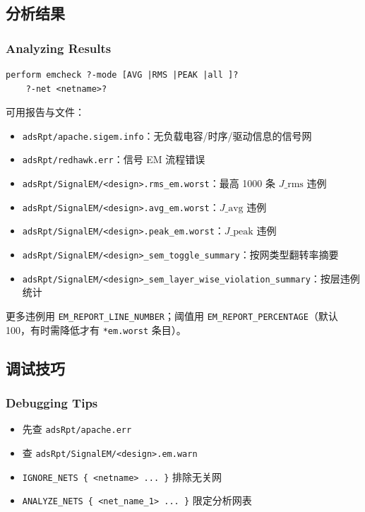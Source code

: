 \subsection{分析结果}
\subsubsection*{Analyzing Results}

\begin{lstlisting}
perform emcheck ?-mode [AVG |RMS |PEAK |all ]?
    ?-net <netname>?
\end{lstlisting}

可用报告与文件：
\begin{itemize}
  \item \texttt{adsRpt/apache.sigem.info}：无负载电容/时序/驱动信息的信号网
  \item \texttt{adsRpt/redhawk.err}：信号 EM 流程错误
  \item \texttt{adsRpt/SignalEM/<design>.rms\_em.worst}：最高 1000 条 $J\_{\mathrm{rms}}$ 违例
  \item \texttt{adsRpt/SignalEM/<design>.avg\_em.worst}：$J\_{\mathrm{avg}}$ 违例
  \item \texttt{adsRpt/SignalEM/<design>.peak\_em.worst}：$J\_{\mathrm{peak}}$ 违例
  \item \texttt{adsRpt/SignalEM/<design>\_sem\_toggle\_summary}：按网类型翻转率摘要
  \item \texttt{adsRpt/SignalEM/<design>\_sem\_layer\_wise\_violation\_summary}：按层违例统计
\end{itemize}

更多违例用 \texttt{EM\_REPORT\_LINE\_NUMBER}；阈值用 \texttt{EM\_REPORT\_PERCENTAGE}（默认 100，有时需降低才有 \texttt{*em.worst} 条目）。

\subsection{调试技巧}
\subsubsection*{Debugging Tips}

\begin{itemize}
  \item 先查 \texttt{adsRpt/apache.err}
  \item 查 \texttt{adsRpt/SignalEM/<design>.em.warn}
  \item \texttt{IGNORE\_NETS \{ <netname> ... \}} 排除无关网
  \item \texttt{ANALYZE\_NETS \{ <net\_name\_1> ... \}} 限定分析网表
\end{itemize}
